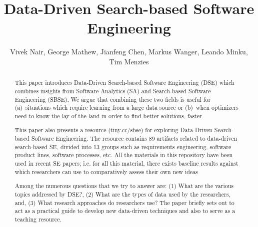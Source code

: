 \documentclass[sigconf,anonymous,review]{acmart}
\begin{document}
\title{Data-Driven Search-based Software Engineering}

\author{Vivek Nair, George Mathew, Jianfeng Chen, Markus Wanger, Leando Minku, Tim Menzies}
\email{}


\begin{abstract}
This paper introduces Data-Driven Search-based Software Engineering (DSE) which combines insights from Software Analytics (SA) and Search-based Software Engineering (SBSE).  We argue that  
combining these two fields
is useful for (a)~situations which require learning from a large data
source or (b)~when optimizers need to know the lay of the land in order to find better solutions, faster


This paper also presents a  resource (tiny.cc/sbse) for exploring
Data-Driven Search-based Software Engineering.  The resource contains 89 artifacts related to data-driven search-based SE,
divided into 13 groups such as requirements engineering, software product lines, software processes, etc.
All the materials in this repository
have been   used in recent SE papers; i.e. for all this material, there exists baseline results against which researchers can use to comparatively assess their own new ideas


Among the numerous questions that we try to answer are: (1) What are the various topics addressed by DSE?, (2) What are the types of data used by the researchers, and, (3) What research approaches do researchers use? The paper briefly sets out to act as a practical guide to develop new data-driven techniques and also to serve as a teaching resource.
\end{abstract}

%
%
\end{document}
